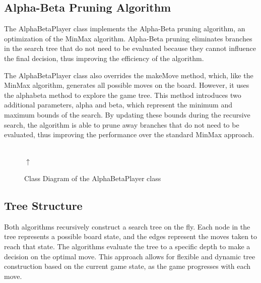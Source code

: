 \documentclass[11pt,a4paper]{article}
\begin{document}
\subsection{Alpha-Beta Pruning Algorithm}
The AlphaBetaPlayer class implements the Alpha-Beta pruning algorithm, an optimization of the MinMax algorithm. Alpha-Beta pruning eliminates branches in the search tree that do not need to be evaluated because they cannot influence the final decision, thus improving the efficiency of the algorithm.

The AlphaBetaPlayer class also overrides the makeMove method, which, like the MinMax algorithm, generates all possible moves on the board. However, it uses the alphabeta method to explore the game tree. This method introduces two additional parameters, alpha and beta, which represent the minimum and maximum bounds of the search. By updating these bounds during the recursive search, the algorithm is able to prune away branches that do not need to be evaluated, thus improving the performance over the standard MinMax approach.

\begin{figure}[H]
\centering
{}
\\[-0.4em]
$\uparrow$\\[-0.4em]
\caption{Class Diagram of the AlphaBetaPlayer class}
\end{figure}

\subsection{Tree Structure}
Both algorithms recursively construct a search tree on the fly. Each node in the tree represents a possible board state, and the edges represent the moves taken to reach that state. The algorithms evaluate the tree to a specific depth to make a decision on the optimal move. This approach allows for flexible and dynamic tree construction based on the current game state, as the game progresses with each move.
\end{document}

